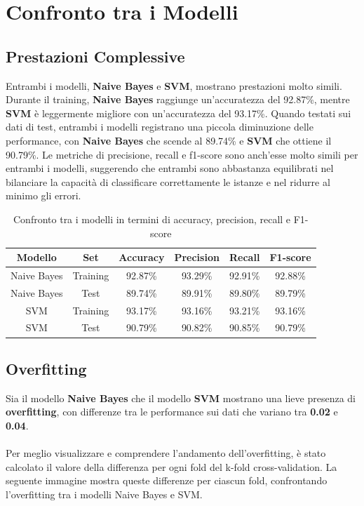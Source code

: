 \newpage

\section{Confronto tra i Modelli}

\subsection{Prestazioni Complessive}

Entrambi i modelli, \textbf{Naive Bayes} e \textbf{SVM}, mostrano prestazioni molto simili. Durante il training, \textbf{Naive Bayes} raggiunge un'accuratezza del 92.87\%, mentre \textbf{SVM} è leggermente migliore con un'accuratezza del 93.17\%. Quando testati sui dati di test, entrambi i modelli registrano una piccola diminuzione delle performance, con \textbf{Naive Bayes} che scende al 89.74\% e \textbf{SVM} che ottiene il 90.79\%. Le metriche di precisione, recall e f1-score sono anch'esse molto simili per entrambi i modelli, suggerendo che entrambi sono abbastanza equilibrati nel bilanciare la capacità di classificare correttamente le istanze e nel ridurre al minimo gli errori.

\begin{table}[H]
    \centering
    \begin{tabular}{|c|c|c|c|c|c|}
        \hline
        \textbf{Modello} & \textbf{Set} & \textbf{Accuracy} & \textbf{Precision} & \textbf{Recall} & \textbf{F1-score} \\
        \hline
        Naive Bayes & Training & 92.87\% & 93.29\% & 92.91\% & 92.88\% \\
        \hline
        Naive Bayes & Test & 89.74\% & 89.91\% & 89.80\% & 89.79\% \\
        \hline
        SVM & Training & 93.17\% & 93.16\% & 93.21\% & 93.16\% \\
        \hline
        SVM & Test & 90.79\% & 90.82\% & 90.85\% & 90.79\% \\
        \hline
    \end{tabular}
    \caption{Confronto tra i modelli in termini di accuracy, precision, recall e F1-score}
    \label{tab:confronto_metriche}
\end{table}


\subsection{Overfitting}

Sia il modello \textbf{Naive Bayes} che il modello \textbf{SVM} mostrano una lieve presenza di \textbf{overfitting}, con differenze tra le performance sui dati che variano tra \textbf{0.02} e \textbf{0.04}. \\ \\
Per meglio visualizzare e comprendere l'andamento dell'overfitting, è stato calcolato il valore della differenza per ogni fold del k-fold cross-validation. La seguente immagine mostra queste differenze per ciascun fold, confrontando l'overfitting tra i modelli Naive Bayes e SVM.

